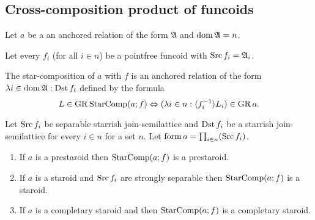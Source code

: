 \subsection{Cross-composition product of funcoids}

Let $a$ be a an anchored relation of the form $\mathfrak{A}$ and
$\operatorname{dom}\mathfrak{A}=n$.

Let every $f_{i}$ (for all $i\in n$) be a pointfree funcoid with
$\operatorname{Src} f_{i}=\mathfrak{A}_{i}$.

The star-composition of $a$ with $f$ is an anchored relation of
the form $\lambda i\in\operatorname{dom}\mathfrak{A}:\operatorname{Dst} f_{i}$ defined by the
formula 
\[
L\in\operatorname{GR}\operatorname{StarComp}(a;f)\Leftrightarrow(\lambda i\in n:\langle f_{i}^{-1}\rangle L_{i})\in\operatorname{GR} a.
\]

\begin{thm}
Let $\operatorname{Src} f_{i}$ be separable starrish join-semilattice and $\operatorname{Dst} f_{i}$
be a starrish join-semilattice for every $i\in n$ for a set $n$.
Let $\operatorname{form} a=\prod_{i\in n}(\operatorname{Src} f_{i})$.
\begin{enumerate}
\item \label{fcomp-pre}If $a$ is a prestaroid then $\operatorname{StarComp}(a;f)$ is
a prestaroid.
\item \label{fcomp-str}If $a$ is a staroid and $\operatorname{Src} f_i$ are strongly separable then $\operatorname{StarComp}(a;f)$ is a
staroid.
\item \label{fcomp-compl}If $a$ is a completary staroid and then $\operatorname{StarComp}(a;f)$
is a completary staroid.
\end{enumerate}
\end{thm}
